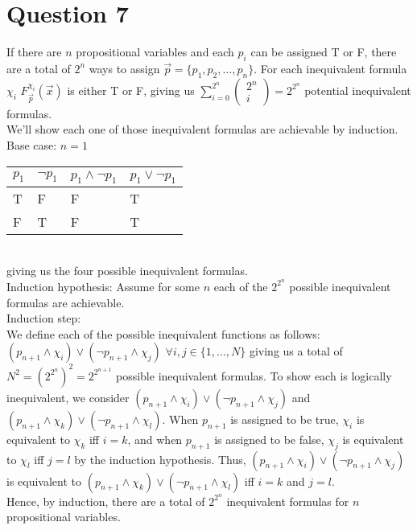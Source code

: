 \documentclass[10pt]{article}
\begin{document}
\section*{Question 7}
If there are $n$ propositional variables and each $p_i$ can be assigned T or F, there are a total of $2^n$ ways to assign $\vec{p}=\{p_1,p_2,\ldots,p_n\}$. 
For each inequivalent formula $\chi_i$ $F^{\chi_i}_{\vec{p}}(\vec{x})$ is either T or F, giving us 
$\displaystyle\sum_{i=0}^{2^n}\begin{pmatrix}
    2^n\\
    i
\end{pmatrix}=2^{2^n}$ potential inequivalent formulas.\\
We'll show each one of those inequivalent formulas are achievable by induction.\\
Base case: $n=1$\\
\begin{table}[h]
    \begin{tabular}{|l|l|l|l|}
    \hline
    $p_1$ & $\lnot p_1$ & $p_1\land\lnot p_1$ & $p_1\lor\lnot p_1$ \\ \hline
    T     & F           & F                   & T                  \\ \hline
    F     & T           & F                   & T                  \\ \hline
    \end{tabular}
    \end{table}\\
giving us the four possible inequivalent formulas.\\
Induction hypothesis: Assume for some $n$ each of the $2^{2^n}$ possible inequivalent formulas are achievable.\\
Induction step: \\
We define each of the possible inequivalent functions as follows:\\
$(p_{n+1}\land\chi_i)\lor(\lnot p_{n+1}\land\chi_j)$ $\forall i,j\in\{1,\ldots,N\}$ giving us a total of $N^2={(2^{2^n})}^2=2^{2^{n+1}}$ possible inequivalent formulas.
To show each is logically inequivalent, we consider $(p_{n+1}\land\chi_i)\lor(\lnot p_{n+1}\land\chi_j)$ and $(p_{n+1}\land\chi_k)\lor(\lnot p_{n+1}\land\chi_l)$.
When $p_{n+1}$ is assigned to be true, $\chi_i$ is equivalent to $\chi_k$ iff $i=k$, and when $p_{n+1}$ is assigned to be false, $\chi_j$ is equivalent to $\chi_l$ iff $j=l$ by the induction hypothesis.
Thus, $(p_{n+1}\land\chi_i)\lor(\lnot p_{n+1}\land\chi_j)$ is equivalent to $(p_{n+1}\land\chi_k)\lor(\lnot p_{n+1}\land\chi_l)$ iff $i=k$ and $j=l$.\\
Hence, by induction, there are a total of $2^{2^n}$ inequivalent formulas for $n$ propositional variables.
\end{document}
